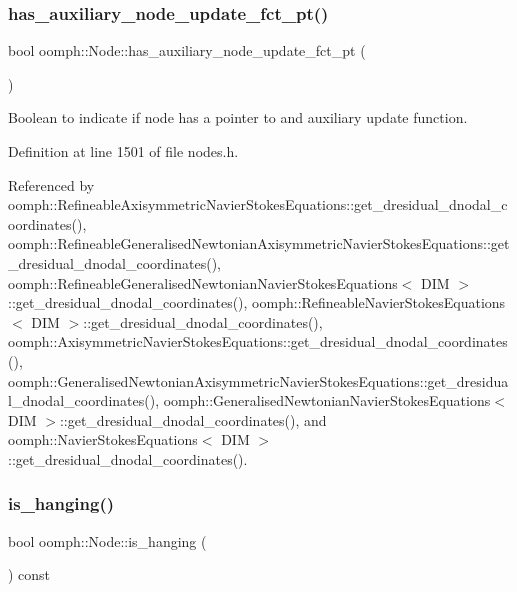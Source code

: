 \subsubsection{\texorpdfstring{has\+\_\+auxiliary\+\_\+node\+\_\+update\+\_\+fct\+\_\+pt()}{has\_auxiliary\_node\_update\_fct\_pt()}}
{\footnotesize\ttfamily bool oomph\+::\+Node\+::has\+\_\+auxiliary\+\_\+node\+\_\+update\+\_\+fct\+\_\+pt (\begin{DoxyParamCaption}{ }\end{DoxyParamCaption})\hspace{0.3cm}{\ttfamily [inline]}}



Boolean to indicate if node has a pointer to and auxiliary update function. 



Definition at line 1501 of file nodes.\+h.



Referenced by oomph\+::\+Refineable\+Axisymmetric\+Navier\+Stokes\+Equations\+::get\+\_\+dresidual\+\_\+dnodal\+\_\+coordinates(), oomph\+::\+Refineable\+Generalised\+Newtonian\+Axisymmetric\+Navier\+Stokes\+Equations\+::get\+\_\+dresidual\+\_\+dnodal\+\_\+coordinates(), oomph\+::\+Refineable\+Generalised\+Newtonian\+Navier\+Stokes\+Equations$<$ D\+I\+M $>$\+::get\+\_\+dresidual\+\_\+dnodal\+\_\+coordinates(), oomph\+::\+Refineable\+Navier\+Stokes\+Equations$<$ D\+I\+M $>$\+::get\+\_\+dresidual\+\_\+dnodal\+\_\+coordinates(), oomph\+::\+Axisymmetric\+Navier\+Stokes\+Equations\+::get\+\_\+dresidual\+\_\+dnodal\+\_\+coordinates(), oomph\+::\+Generalised\+Newtonian\+Axisymmetric\+Navier\+Stokes\+Equations\+::get\+\_\+dresidual\+\_\+dnodal\+\_\+coordinates(), oomph\+::\+Generalised\+Newtonian\+Navier\+Stokes\+Equations$<$ D\+I\+M $>$\+::get\+\_\+dresidual\+\_\+dnodal\+\_\+coordinates(), and oomph\+::\+Navier\+Stokes\+Equations$<$ D\+I\+M $>$\+::get\+\_\+dresidual\+\_\+dnodal\+\_\+coordinates().

\mbox{\label{classoomph_1_1Node_af0e6237dfafad62cf427ff5013ddcfef}} 
\subsubsection{\texorpdfstring{is\+\_\+hanging()}{is\_hanging()}\hspace{0.1cm}{\footnotesize\ttfamily [1/2]}}
{\footnotesize\ttfamily bool oomph\+::\+Node\+::is\+\_\+hanging (\begin{DoxyParamCaption}{ }\end{DoxyParamCaption}) const\hspace{0.3cm}{\ttfamily [inline]}}



